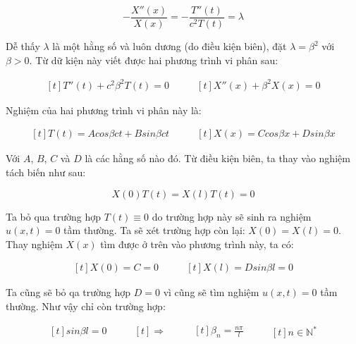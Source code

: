 \documentclass[a4paper]{article}
\begin{document}
\begin{equation*}
    -\frac{X''(x)}{X(x)} = -\frac{T''(t)}{c^2T(t)} = \lambda
\end{equation*}

Dễ thấy $\lambda$ là một hằng số và luôn dương (do điều kiện biên), đặt $\lambda = \beta^2$ với $\beta > 0$. Từ dữ kiện này viết được hai phương trình vi phân sau:

\begin{equation*}
\begin{aligned}[t]
T''(t) + c^2\beta^2T(t) = 0
\end{aligned}
\qquad
\begin{aligned}[t]
X''(x) + \beta^2X(x) = 0
\end{aligned}
\end{equation*}

Nghiệm của hai phương trình vi phân này là:

\begin{equation*}
\begin{aligned}[t]
T(t) = Acos\beta ct + Bsin\beta ct
\end{aligned}
\qquad
\begin{aligned}[t]
X(x) = Ccos\beta x + Dsin\beta x
\end{aligned}
\end{equation*}

Với $A$, $B$, $C$ và $D$ là các hằng số nào đó. Từ điều kiện biên, ta thay vào nghiệm tách biến như sau:

\begin{equation*}
X(0)T(t) = X(l)T(t) = 0
\end{equation*}

Ta bỏ qua trường hợp $T(t) \equiv 0$ do trường hợp này sẽ sinh ra nghiệm $u(x, t) = 0$ tầm thường. Ta sẽ xét trường hợp còn lại: $X(0) = X(l) = 0$. Thay nghiệm $X(x)$ tìm được ở trên vào phương trình này, ta có:

\begin{equation*}
\begin{aligned}[t]
X(0) = C = 0
\end{aligned}
\qquad
\begin{aligned}[t]
X(l) = Dsin\beta l = 0
\end{aligned}
\end{equation*}

Ta cũng sẽ bỏ qa trường hợp $D = 0$ vì cũng sẽ tìm nghiệm $u(x, t) = 0$ tầm thường. Như vậy chỉ còn trường hợp:

\begin{equation*}
\begin{aligned}[t]
sin\beta l = 0
\end{aligned}
\qquad
\begin{aligned}[t]
\Rightarrow
\end{aligned}
\qquad
\begin{aligned}[t]
\beta_n = \frac{n\pi}{l}
\end{aligned}
\qquad
\begin{aligned}[t]
n \in \mathbb{N}^*
\end{aligned}
\end{equation*}
\end{document}
